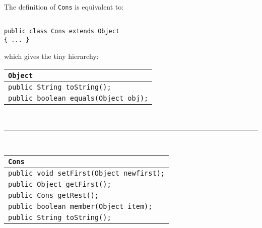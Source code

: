 \begin{slide*}
The definition of {\tt Cons} is equivalent to:

\begin{scriptsize}
\begin{verbatim}

public class Cons extends Object
{ ... }

\end{verbatim}
\end{scriptsize}

which gives the tiny hierarchy:\\

\begin{scriptsize}
\begin{center}
\begin{tabular}{|l|}
\hline
{\tt Object}\\\hline
{\tt public String toString();}\\
{\tt public boolean equals(Object obj);}\\\hline
\end{tabular}\\
\rule{3pt}{4ex}\\
\begin{tabular}{|l|}
\hline
{\tt Cons}\\\hline
{\tt public void setFirst(Object newfirst);}\\
{\tt public Object getFirst();}\\
{\tt public Cons getRest();}\\
{\tt public boolean member(Object item);}\\
{\tt public String toString();}\\\hline
\end{tabular}
\end{center}
\end{scriptsize}

\vfil
\end{slide*}

